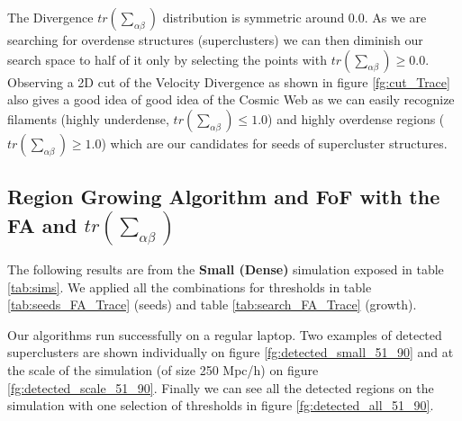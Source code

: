 \documentclass[12pt]{article}
\begin{document}
\begin{par}
The Divergence $tr \left(\sum_{\alpha\beta}\right)$ distribution is symmetric
 around 0.0. As we are searching for overdense
  structures (superclusters) we can then diminish
   our search space to half of it only by
    selecting the points with $tr \left(\sum_{\alpha\beta}\right) \geq 0.0$. \\
Observing a 2D cut of the Velocity Divergence as shown in
 figure \ref{fg:cut_Trace} also gives a good idea
  of good idea of the Cosmic Web as we can easily
   recognize filaments (highly underdense, $tr \left(\sum_{\alpha\beta}\right)
    \leq 1.0$) and highly overdense regions
     ($tr \left(\sum_{\alpha\beta}\right) \geq 1.0$) which are our candidates
      for seeds of supercluster structures.
\end{par}


\subsection{Region Growing Algorithm and FoF with the FA and $tr \left(\sum_{\alpha\beta}\right)$}
\begin{par}
The following results are from the \textbf{Small
 (Dense)} simulation exposed in table
  \ref{tab:sims}. We applied all the combinations
   for thresholds in table \ref{tab:seeds_FA_Trace}
    (seeds)  and table \ref{tab:search_FA_Trace}
     (growth). \\
\end{par}

\begin{par}
Our algorithms run successfully on a regular
 laptop. Two examples of detected superclusters are
  shown individually on figure
   \ref{fg:detected_small_51_90} and at the scale
    of the simulation (of size 250 Mpc/h) on figure
     \ref{fg:detected_scale_51_90}. Finally we can
      see all the detected regions on the
       simulation with one selection of thresholds
        in figure \ref{fg:detected_all_51_90}.
\end{par}
\end{document}
